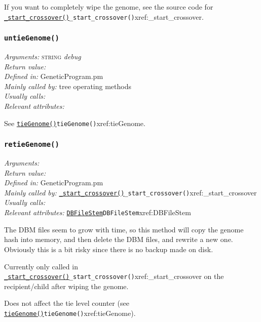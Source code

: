\documentclass[a4paper]{article}
\begin{document}
If you want to completely wipe the genome, see the source code for
\hyperref[no]{\texttt{\_start\_crossover()}}{\texttt{\_start\_crossover()}}{xref:_start_crossover}.

\subsubsection{\texttt{untieGenome()}}\label{xref:untieGenome}
\begin{flushleft}
\textit{Arguments:} \textsc{string} \textit{debug} \\
\textit{Return value:} \\
\textit{Defined in:} GeneticProgram.pm\\
\textit{Mainly called by:} tree operating methods\\
\textit{Usually calls:} \\
\textit{Relevant attributes:}
\end{flushleft}

See \hyperref[no]{\texttt{tieGenome()}}{\texttt{tieGenome()}}{xref:tieGenome}.

\subsubsection{\texttt{retieGenome()}}\label{xref:retieGenome}
\begin{flushleft}
\textit{Arguments:} \\
\textit{Return value:} \\
\textit{Defined in:} GeneticProgram.pm\\
\textit{Mainly called by:} \hyperref[no]{\texttt{\_start\_crossover()}}{\texttt{\_start\_crossover()}}{xref:_start_crossover}\\
\textit{Usually calls:} \\
\textit{Relevant attributes:} \hyperref[no]{\texttt{DBFileStem}}{\texttt{DBFileStem}}{xref:DBFileStem}
\end{flushleft}

The DBM files seem to grow with time, so this method
will copy the genome hash into memory, and then delete
the DBM files, and rewrite a new one.  Obviously this
is a bit risky since there is no backup made on disk.

Currently only called in \hyperref[no]{\texttt{\_start\_crossover()}}{\texttt{\_start\_crossover()}}{xref:_start_crossover}
on the recipient/child after wiping the genome.

Does not affect the tie level counter (see \hyperref[no]{\texttt{tieGenome()}}{\texttt{tieGenome()}}{xref:tieGenome}).
\end{document}
